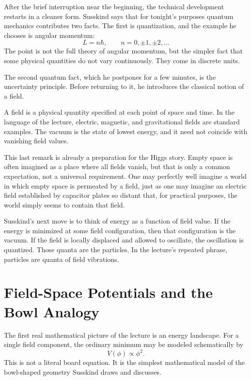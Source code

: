 After the brief interruption near the beginning, the technical development restarts in a cleaner form. Susskind says that for tonight's purposes quantum mechanics contributes two facts. The first is quantization, and the example he chooses is angular momentum:
\begin{equation}
L=n\hbar,\qquad n=0,\pm1,\pm2,\dots
\end{equation}
The point is not the full theory of angular momentum, but the simpler fact that some physical quantities do not vary continuously. They come in discrete units.

The second quantum fact, which he postpones for a few minutes, is the uncertainty principle. Before returning to it, he introduces the classical notion of a field.

\begin{definition}
A field is a physical quantity specified at each point of space and time. In the language of the lecture, electric, magnetic, and gravitational fields are standard examples. The vacuum is the state of lowest energy, and it need not coincide with vanishing field values.
\end{definition}

This last remark is already a preparation for the Higgs story. Empty space is often imagined as a place where all fields vanish, but that is only a common expectation, not a universal requirement. One may perfectly well imagine a world in which empty space is permeated by a field, just as one may imagine an electric field established by capacitor plates so distant that, for practical purposes, the world simply seems to contain that field.

Susskind's next move is to think of energy as a function of field value. If the energy is minimized at some field configuration, then that configuration is the vacuum. If the field is locally displaced and allowed to oscillate, the oscillation is quantized. Those quanta are the particles. In the lecture's repeated phrase, particles are quanta of field vibrations.

\section{Field-Space Potentials and the Bowl Analogy}

The first real mathematical picture of the lecture is an energy landscape. For a single field component, the ordinary minimum may be modeled schematically by
\begin{equation}
V(\phi)\propto \phi^{2}.
\end{equation}
This is not a literal board equation. It is the simplest mathematical model of the bowl-shaped geometry Susskind draws and discusses.

